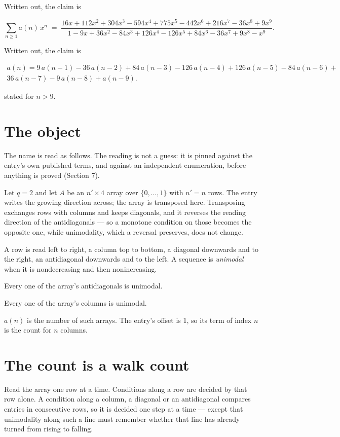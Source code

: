 \documentclass[11pt]{article}
\theoremstyle{definition}
\begin{document}
Written out, the claim is

\[\sum_{n \ge 1} a(n)\,x^n \;=\; \frac{16x + 112x^{2} + 304x^{3} - 594x^{4} + 775x^{5} - 442x^{6} + 216x^{7} - 36x^{8} + 9x^{9}}{1 - 9x + 36x^{2} - 84x^{3} + 126x^{4} - 126x^{5} + 84x^{6} - 36x^{7} + 9x^{8} - x^{9}}.\]

Written out, the claim is

\begin{multline*} a(n) = 9\,a(n-1) - 36\,a(n-2) + 84\,a(n-3) - 126\,a(n-4) + 126\,a(n-5) - 84\,a(n-6) + \\ 36\,a(n-7) - 9\,a(n-8) + a(n-9). \end{multline*}

stated for $n > 9$.

\section{The object}

The name is read as follows. The reading is not a guess: it is pinned against the entry's own published terms, and against an independent enumeration, before anything is proved (Section 7).

Let $q = 2$ and let $A$ be an $n' \times 4$ array over $\{0,\dots,1\}$ with $n' = n$ rows. The entry writes the growing direction across; the array is transposed here. Transposing exchanges rows with columns and keeps diagonals, and it reverses the reading direction of the antidiagonals --- so a monotone condition on those becomes the opposite one, while unimodality, which a reversal preserves, does not change.

A row is read left to right, a column top to bottom, a diagonal downwards and to the right, an antidiagonal downwards and to the left. A sequence is {\itshape unimodal} when it is nondecreasing and then nonincreasing.

Every one of the array's antidiagonals is unimodal.

Every one of the array's columns is unimodal.

$a(n)$ is the number of such arrays. The entry's offset is 1, so its term of index $n$ is the count for $n$ columns.

\section{The count is a walk count}

Read the array one row at a time. Conditions along a row are decided by that row alone. A condition along a column, a diagonal or an antidiagonal compares entries in consecutive rows, so it is decided one step at a time --- except that unimodality along such a line must remember whether that line has already turned from rising to falling.
\end{document}
